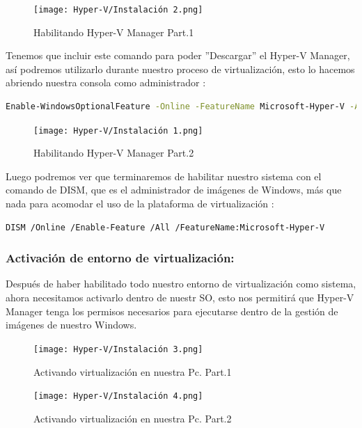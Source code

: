 \documentclass[journal]{IEEEtran}
\begin{document}
\begin{figure}[htbp]
  \centering
  \texttt{[image: Hyper-V/Instalación 2.png]}
  \caption{Habilitando Hyper-V Manager Part.1}
\end{figure}

Tenemos que incluir este comando para poder ''Descargar'' el Hyper-V Manager, así podremos utilizarlo durante nuestro proceso de virtualización, esto lo hacemos abriendo nuestra consola como administrador\cite{Wlear2024} :\\

\begin{lstlisting}[language=bash]
Enable-WindowsOptionalFeature -Online -FeatureName Microsoft-Hyper-V -All
\end{lstlisting}

\begin{figure}[htbp]
  \centering
  \texttt{[image: Hyper-V/Instalación 1.png]}
  \caption{Habilitando Hyper-V Manager Part.2}
\end{figure}

 Luego podremos ver que terminaremos de habilitar nuestro sistema con el comando de DISM, que es el administrador de imágenes de Windows, más que nada para acomodar el uso de la plataforma de virtualización\cite{Wlear2024} :\\

\begin{lstlisting}[language=bash]
DISM /Online /Enable-Feature /All /FeatureName:Microsoft-Hyper-V
\end{lstlisting}

\subsubsection{Activación de entorno de virtualización:}
Después de haber habilitado todo nuestro entorno de virtualización como sistema, ahora necesitamos activarlo dentro de nuestr SO, esto nos permitirá que Hyper-V Manager tenga los permisos necesarios para ejecutarse dentro de la gestión de imágenes de nuestro Windows.\\

\begin{figure}[htbp]
  \centering
  \texttt{[image: Hyper-V/Instalación 3.png]}
  \caption{Activando virtualización en nuestra Pc. Part.1}
\end{figure}

\begin{figure}[htbp]
  \centering
  \texttt{[image: Hyper-V/Instalación 4.png]}
  \caption{Activando virtualización en nuestra Pc. Part.2}
\end{figure}
\end{document}
